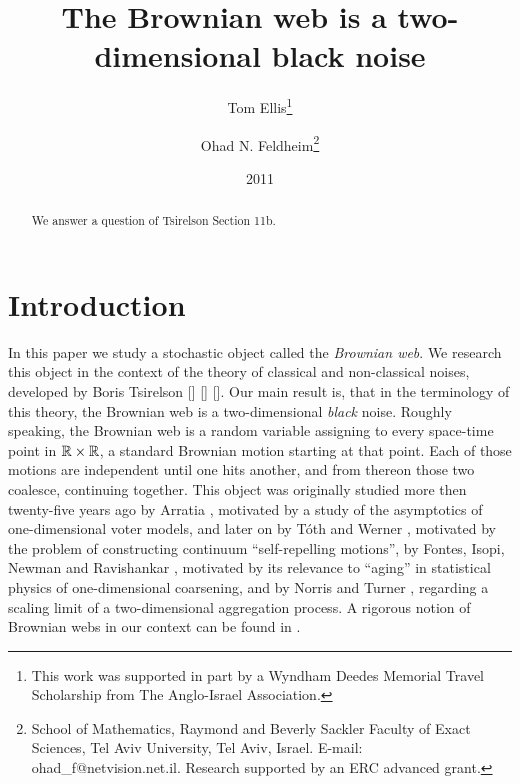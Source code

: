 \newcommand{\sigfield}{$\sigma$-field}
{
\title{The Brownian web is a two-dimensional black noise}

\newcommand{\tomthanks}{This work was supported in part by
a Wyndham Deedes Memorial Travel Scholarship from The Anglo-Israel
Association.}

\newcommand{\ohadthanks}{School of Mathematics, Raymond and Beverly Sackler Faculty of Exact
Sciences, Tel Aviv University, Tel Aviv, Israel. E-mail:
ohad\_f@netvision.net.il. Research supported by an ERC advanced grant.}

\author{Tom Ellis\thanks{\tomthanks}\\%
\and Ohad N. Feldheim\thanks{\ohadthanks}}

\date{2011}

\maketitle

\begin{abstract}
We answer a question of
Tsirelson \cite{tsirelson-nonclassical-stochastic-flows} Section 11b.

\end{abstract}

\section{Introduction}
In this paper we study a stochastic object called the \emph{Brownian web}. We
research this object in the context of the theory of classical and
non-classical noises, developed by Boris Tsirelson [] [] []. Our main result
is, that in the terminology of this theory, the Brownian web is a
two-dimensional \emph{black} noise.
Roughly speaking, the Brownian web is a random variable assigning to
every space-time point in $\mathbb{R}\times\mathbb{R}$, a standard Brownian motion starting
at that point. Each of those motions are independent until one hits another,
and from thereon those two coalesce, continuing together. This object was
originally studied more then twenty-five years ago by Arratia \cite{arratia}, motivated
by a study of the asymptotics of one-dimensional voter models, and later on
by T\'{o}th and Werner \cite{toth-werner},
motivated by the problem of constructing continuum
``self-repelling motions'', by Fontes, Isopi, Newman and Ravishankar
\cite{fontes-et-al},
motivated by its relevance to ``aging'' in statistical physics of
one-dimensional coarsening, and by Norris and Turner
\cite{norris-turner-convergence-to-bw},\cite{norris-turner-planar-aggregation}
regarding a scaling limit of a two-dimensional aggregation process.
A rigorous notion of Brownian webs in our context
can be found in .

}
